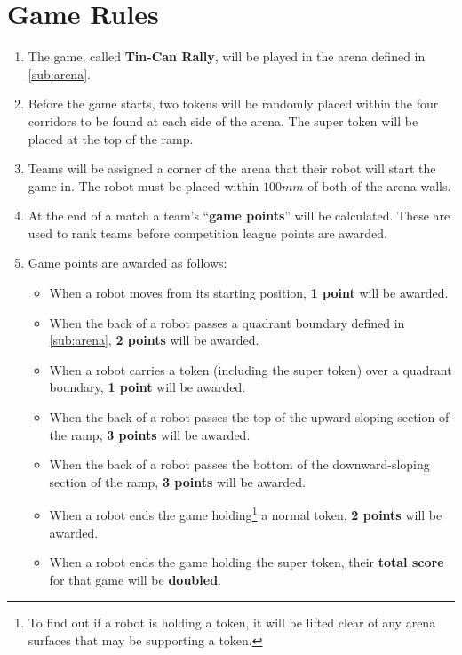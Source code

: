 \section {Game Rules}
\label{game-rules}

\begin{enumerate}
\item The game, called \textbf{Tin-Can Rally}, will be played in the arena defined in \autoref{sub:arena}.
\item Before the game starts, two tokens will be randomly placed within the four corridors to be found at each side of the arena.  The super token will be placed at the top of the ramp.
\item Teams will be assigned a corner of the arena that their robot will start the game in.
 The robot must be placed within $100mm$ of both of the arena walls.
\item At the end of a match a team's ``\textbf{game points}'' will be calculated.
 These are used to rank teams before competition league points are awarded.

\item Game points are awarded as follows:

\begin{itemize}
\item When a robot moves from its starting position, \textbf{1 point} will be awarded.
\item When the back of a robot passes a quadrant boundary defined in \autoref{sub:arena}, \textbf{2 points} will be awarded.
\item When a robot carries a token (including the super token) over a quadrant boundary, \textbf{1 point} will be awarded.
\item When the back of a robot passes the top of the upward-sloping section of the ramp, \textbf{3 points} will be awarded.
\item When the back of a robot passes the bottom of the downward-sloping section of the ramp, \textbf{3 points} will be awarded.
\item When a robot ends the game holding\footnote{To find out if a robot is holding a token, it will be lifted clear of any arena surfaces that may be supporting a token.} a normal token, \textbf{2 points} will be awarded.
\item When a robot ends the game holding the super token, their \textbf{total score} for that game will be \textbf{doubled}.
\end{itemize}


\end{enumerate}
